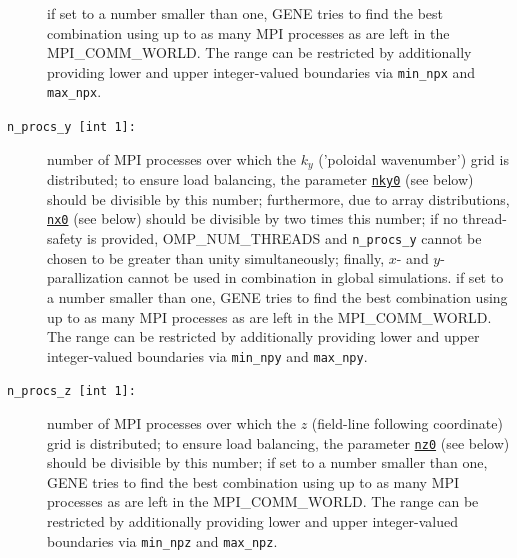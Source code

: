 \documentclass[12pt]{article}
\begin{document}
\begin{description}
if set to a number smaller than one, GENE tries to find the best combination using up to as many
MPI processes as are left in the MPI\_COMM\_WORLD. The range can be restricted by additionally providing
lower and upper integer-valued boundaries via \texttt{min\_npx} and \texttt{max\_npx}.
\item[\texttt{n\_procs\_y [int 1]:}] number of MPI processes over which the $k_y$ ('poloidal wavenumber')
grid is distributed; to ensure load balancing, the parameter \hyperlink{nky0}{\tt nky0} (see below) should be divisible
by this number; furthermore, due to array distributions, \hyperlink{nx0}{\tt nx0} (see below) should be divisible
by two times this number; if no thread-safety is provided, OMP\_NUM\_THREADS and \texttt{n\_procs\_y}
cannot be chosen to be greater than unity simultaneously;
finally, $x$- and $y$-parallization cannot be used in combination in global simulations.
if set to a number smaller than one, GENE tries to find the best combination using up to as many
MPI processes as are left in the MPI\_COMM\_WORLD. The range can be restricted by additionally providing
lower and upper integer-valued boundaries via \texttt{min\_npy} and \texttt{max\_npy}.
\item[\texttt{n\_procs\_z [int 1]:}] number of MPI processes over which the $z$ (field-line following
coordinate) grid is distributed; to ensure load balancing, the parameter \hyperlink{nz0}{\tt nz0} (see below)
should be divisible by this number;
if set to a number smaller than one, GENE tries to find the best combination using up to as many
MPI processes as are left in the MPI\_COMM\_WORLD. The range can be restricted by additionally providing
lower and upper integer-valued boundaries via \texttt{min\_npz} and \texttt{max\_npz}.
\end{description}
\end{document}
